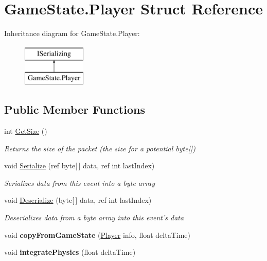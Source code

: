 \hypertarget{struct_game_state_1_1_player}{\section{Game\-State.\-Player Struct Reference}
\label{struct_game_state_1_1_player}
}
Inheritance diagram for Game\-State.\-Player\-:\begin{figure}[H]
\begin{center}
\leavevmode
\includegraphics[height=2.000000cm]{struct_game_state_1_1_player}
\end{center}
\end{figure}
\subsection*{Public Member Functions}
\begin{DoxyCompactItemize}
\item 
int \hyperlink{struct_game_state_1_1_player_a58e1b4e7eaca487703abf36826e41c45}{Get\-Size} ()
\begin{DoxyCompactList}\small\item\em Returns the size of the packet (the size for a potential byte\mbox{[}\mbox{]}) \end{DoxyCompactList}\item 
void \hyperlink{struct_game_state_1_1_player_aa8df830f0a0bcfbfb263a634d125c3a5}{Serialize} (ref byte\mbox{[}$\,$\mbox{]} data, ref int last\-Index)
\begin{DoxyCompactList}\small\item\em Serializes data from this event into a byte array \end{DoxyCompactList}\item 
void \hyperlink{struct_game_state_1_1_player_aaf7c5b93f45be35c3501626cb6759c0b}{Deserialize} (byte\mbox{[}$\,$\mbox{]} data, ref int last\-Index)
\begin{DoxyCompactList}\small\item\em Deserializes data from a byte array into this event's data \end{DoxyCompactList}\item 
\hypertarget{struct_game_state_1_1_player_ace7e3625cf1996b8c56bcafae36673af}{void {\bfseries copy\-From\-Game\-State} (\hyperlink{struct_game_state_1_1_player}{Player} info, float delta\-Time)}\label{struct_game_state_1_1_player_ace7e3625cf1996b8c56bcafae36673af}

\item 
\hypertarget{struct_game_state_1_1_player_a59ac624b5378e8253ac70d827febfe6a}{void {\bfseries integrate\-Physics} (float delta\-Time)}\label{struct_game_state_1_1_player_a59ac624b5378e8253ac70d827febfe6a}

\end{DoxyCompactItemize}
